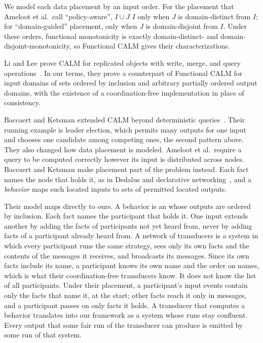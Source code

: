 We model each data placement by an input order.  For the placement that
Ameloot et al.\ call ``policy-aware'', $I\cup J$ \inrel $I$ only when $J$ is domain-distinct from $I$; for ``domain-guided''
placement, only when $J$ is domain-disjoint from $I$.  Under these orders,
functional monotonicity is exactly domain-distinct- and
domain-disjoint-monotonicity, so Functional CALM gives their
characterizations.

Li and Lee prove CALM for replicated objects with write, merge, and query
operations~\cite{li2025coordinationfree}.  In our terms, they prove a
counterpart of Functional CALM for input domains of sets ordered by inclusion
and arbitrary partially ordered output domains, with the existence of a
coordination-free implementation in place of consistency.

Baccaert and Ketsman extended CALM beyond deterministic
queries~\cite{baccaert2023dcbq,baccaert2026spectrum}.  Their running example
is leader election, which permits many outputs for one input and chooses one
candidate among competing ones, the second pattern above.  They also
changed how data placement is modeled.  Ameloot et al.\ require a query to be
computed correctly however its input is distributed across nodes.  Baccaert
and Ketsman make placement part of the problem instead.  Each fact names the
node that holds it, as in Dedalus and declarative
networking~\cite{alvaro2010dedalus,loo2009declarative}, and a
\emph{behavior} maps such located inputs to sets of permitted located outputs.

Their model maps directly to ours.  A behavior is an \spectype whose outputs
are ordered by inclusion.  Each fact names the participant that holds it.  One
input extends another by adding the facts of participants not yet heard from,
never by adding facts of a participant already heard from.  A network of
transducers is a system in which every participant runs the same strategy,
sees only its own facts and the contents of the messages it receives, and
broadcasts its messages.  Since its own facts include its name, a participant
knows its own name and the order on names, which is what their coordination-free
transducers know.  It does not know the list of all participants.  Under their
placement, a participant's input events contain only the facts that name it, at
the start; other facts reach it only in messages, and a participant passes on
only facts it holds.  A
transducer that computes a behavior translates into our framework as a system
whose runs stay confluent.  Every output that some fair run of the transducer can produce is
emitted by some run of that system.

